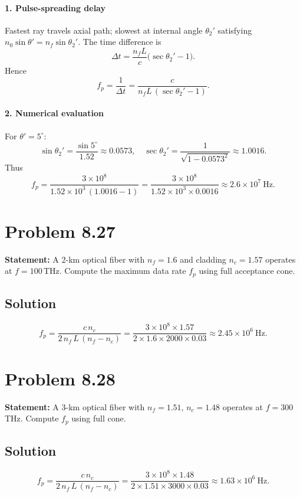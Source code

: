 \paragraph{1. Pulse-spreading delay}
Fastest ray travels axial path; slowest at internal angle $\theta_2'$ satisfying $n_0\sin\theta'=n_f\sin\theta_2'$.  
The time difference is
\[
\Delta t = \frac{n_f L}{c}\bigl(\sec\theta_2' - 1\bigr).
\]
Hence
\[
f_p = \frac{1}{\Delta t}
    = \frac{c}{n_f L\,(\sec\theta_2' - 1)}.
\]

\paragraph{2. Numerical evaluation}
For $\theta'=5^\circ$:  
\[
\sin\theta_2' = \frac{\sin5^\circ}{1.52}\approx0.0573,\quad
\sec\theta_2' = \frac{1}{\sqrt{1 - 0.0573^2}}\approx1.0016.
\]
Thus
\[
f_p = \frac{3\times10^8}{1.52\times10^3\,(1.0016 - 1)}
= \frac{3\times10^8}{1.52\times10^3\times0.0016}
\approx 2.6\times10^7\ \mathrm{Hz}.
\]

\section*{Problem 8.27}
\textbf{Statement:} A 2-km optical fiber with $n_f=1.6$ and cladding $n_c=1.57$ operates at $f=100\,$THz. Compute the maximum data rate $f_p$ using full acceptance cone.

\subsection*{Solution}
\[
f_p = \frac{c\,n_c}{2\,n_f\,L\,(n_f - n_c)}
      = \frac{3\times10^8\times1.57}{2\times1.6\times2000\times0.03}
      \approx 2.45\times10^6\ \mathrm{Hz}.
\]

\section*{Problem 8.28}
\textbf{Statement:} A 3-km optical fiber with $n_f=1.51$, $n_c=1.48$ operates at $f=300\,$THz. Compute $f_p$ using full cone.

\subsection*{Solution}
\[
f_p = \frac{c\,n_c}{2\,n_f\,L\,(n_f - n_c)}
      = \frac{3\times10^8\times1.48}{2\times1.51\times3000\times0.03}
      \approx 1.63\times10^6\ \mathrm{Hz}.
\]

